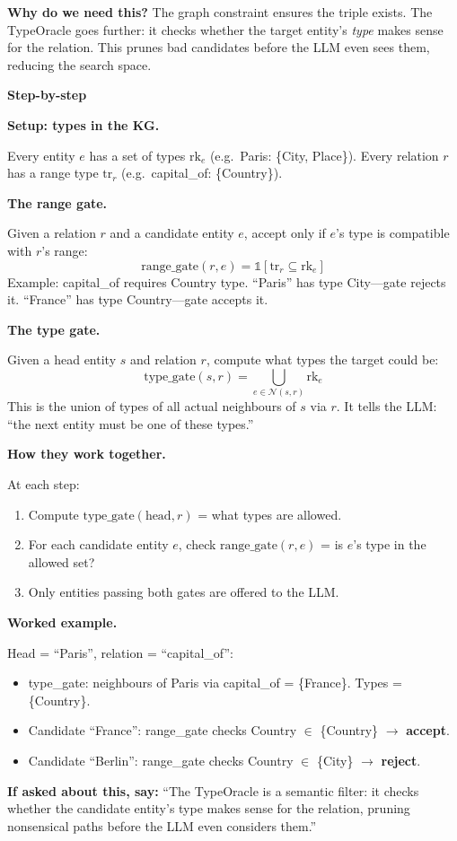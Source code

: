 \documentclass[11pt,a4paper]{article}
\newcommand{\step}[1]{\noindent\textbf{#1}\par\smallskip}
\newcommand{\oneliner}[1]{\begin{onelinerbox}\textbf{If asked about this, say:} #1\end{onelinerbox}\vspace{6pt}}
\newcommand{\whyt}[1]{\begin{whytbox}\textbf{Why do we need this?} #1\end{whytbox}\vspace{6pt}}
\newcommand{\stepboxbegin}{\begin{stepboxmd}\textbf{Step-by-step}\par\smallskip}
\newcommand{\stepboxend}{\end{stepboxmd}\vspace{6pt}}
\begin{document}
\whyt{
The graph constraint ensures the triple exists. The TypeOracle goes further: it checks whether the target entity's \emph{type} makes sense for the relation. This prunes bad candidates before the LLM even sees them, reducing the search space.
}

\stepboxbegin
\step{Setup: types in the KG.}
Every entity $e$ has a set of types $\text{rk}_e$ (e.g.\ Paris: \{City, Place\}). Every relation $r$ has a range type $\text{tr}_r$ (e.g.\ capital\_of: \{Country\}).

\step{The range gate.}
Given a relation $r$ and a candidate entity $e$, accept only if $e$'s type is compatible with $r$'s range:
\[
\text{range\_gate}(r, e) = \mathbb{1}[\text{tr}_r \subseteq \text{rk}_e]
\]
Example: capital\_of requires Country type. ``Paris'' has type City---gate rejects it. ``France'' has type Country---gate accepts it.

\step{The type gate.}
Given a head entity $s$ and relation $r$, compute what types the target could be:
\[
\text{type\_gate}(s, r) = \bigcup_{e \in \mathcal{N}(s,r)} \text{rk}_e
\]
This is the union of types of all actual neighbours of $s$ via $r$. It tells the LLM: ``the next entity must be one of these types.''

\step{How they work together.}
At each step:
\begin{enumerate}
  \item Compute $\text{type\_gate}(\text{head}, r)$ = what types are allowed.
  \item For each candidate entity $e$, check $\text{range\_gate}(r, e)$ = is $e$'s type in the allowed set?
  \item Only entities passing both gates are offered to the LLM.
\end{enumerate}

\step{Worked example.}
Head = ``Paris'', relation = ``capital\_of'':
\begin{itemize}
  \item type\_gate: neighbours of Paris via capital\_of = \{France\}. Types = \{Country\}.
  \item Candidate ``France'': range\_gate checks Country $\in$ \{Country\} $\to$ \textbf{accept}.
  \item Candidate ``Berlin'': range\_gate checks Country $\in$ \{City\} $\to$ \textbf{reject}.
\end{itemize}
\stepboxend

\oneliner{
``The TypeOracle is a semantic filter: it checks whether the candidate entity's type makes sense for the relation, pruning nonsensical paths before the LLM even considers them.''
}
\end{document}
